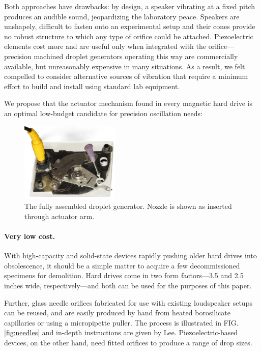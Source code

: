 \documentclass[aip,rsi,reprint,graphicx]{revtex4-1} %
\begin{document}
Both approaches have drawbacks: by design, a speaker vibrating at a fixed pitch
produces an audible sound, jeopardizing the laboratory peace. Speakers are unshapely,
difficult to fasten onto an experimental setup and their cones provide no robust
structure to which any type of orifice could be attached. Piezoelectric elements
cost more and are useful only when integrated with the orifice---precision
machined droplet generators operating this way are commercially available, but
unreasonably expensive in many situations. As a result, we felt compelled to
consider alternative sources of vibration that require a minimum effort to build
and install using standard lab equipment.

We propose that the actuator mechanism
found in every magnetic hard drive is an optimal low-budget candidate for
precision oscillation needs:

\begin{figure}
\centering
\includegraphics[width=0.42\textwidth]{hdg_images/designpicture.jpg}
\caption{The fully assembled droplet generator. Nozzle is shown as inserted
through actuator arm. \label{fig:photo}}
\end{figure}

\paragraph*{Very low cost.} With high-capacity and solid-state devices rapidly pushing older hard drives
into obsolescence, it should be a simple matter to acquire a few decommissioned specimens for
demolition. Hard drives come in two form factors---3.5 and 2.5 inches wide,
respectively---and both can be used for the purposes of this paper. 

Further, glass needle orifices fabricated for use with existing loudspeaker setups can be
reused, and are easily produced by hand from heated borosilicate capillaries or
using a micropipette puller. The process is illustrated in FIG.
\ref{fig:needles} and in-depth instructions are given by Lee\cite{Lee02}.
Piezoelectric-based devices, on the other hand, need fitted orifices to produce a range of
drop sizes.
\end{document}
